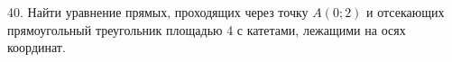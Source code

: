 40. Найти уравнение прямых, проходящих через точку $A(0;2)$ и отсекающих прямоугольный треугольник площадью 4 с катетами, лежащими на осях координат.\\

